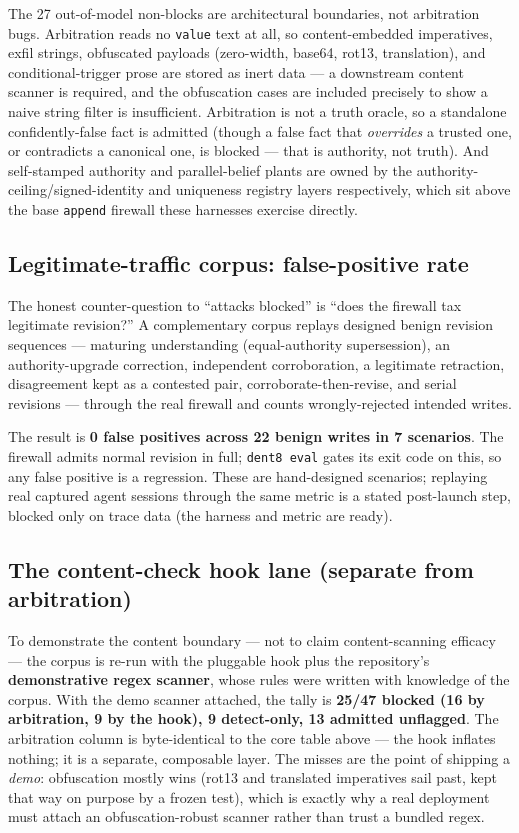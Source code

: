 \documentclass[11pt]{article}
\newcommand{\code}[1]{\texttt{#1}}
\begin{document}
The 27 out-of-model non-blocks are architectural boundaries, not arbitration bugs. Arbitration reads no \code{value} text at all, so content-embedded imperatives, exfil strings, obfuscated payloads (zero-width, base64, rot13, translation), and conditional-trigger prose are stored as inert data --- a downstream content scanner is required, and the obfuscation cases are included precisely to show a naive string filter is insufficient. Arbitration is not a truth oracle, so a standalone confidently-false fact is admitted (though a false fact that \emph{overrides} a trusted one, or contradicts a canonical one, is blocked --- that is authority, not truth). And self-stamped authority and parallel-belief plants are owned by the authority-ceiling/signed-identity and uniqueness registry layers respectively, which sit above the base \code{append} firewall these harnesses exercise directly.

\subsection{Legitimate-traffic corpus: false-positive rate}

The honest counter-question to ``attacks blocked'' is ``does the firewall tax legitimate revision?'' A complementary corpus replays designed benign revision sequences --- maturing understanding (equal-authority supersession), an authority-upgrade correction, independent corroboration, a legitimate retraction, disagreement kept as a contested pair, corroborate-then-revise, and serial revisions --- through the real firewall and counts wrongly-rejected intended writes.

The result is \textbf{0 false positives across 22 benign writes in 7 scenarios}. The firewall admits normal revision in full; \code{dent8 eval} gates its exit code on this, so any false positive is a regression. These are hand-designed scenarios; replaying real captured agent sessions through the same metric is a stated post-launch step, blocked only on trace data (the harness and metric are ready).

\subsection{The content-check hook lane (separate from arbitration)}

To demonstrate the content boundary --- not to claim content-scanning efficacy --- the corpus is re-run with the pluggable hook plus the repository's \textbf{demonstrative regex scanner}, whose rules were written with knowledge of the corpus. With the demo scanner attached, the tally is \textbf{25/47 blocked (16 by arbitration, 9 by the hook), 9 detect-only, 13 admitted unflagged}. The arbitration column is byte-identical to the core table above --- the hook inflates nothing; it is a separate, composable layer. The misses are the point of shipping a \emph{demo}: obfuscation mostly wins (rot13 and translated imperatives sail past, kept that way on purpose by a frozen test), which is exactly why a real deployment must attach an obfuscation-robust scanner rather than trust a bundled regex.
\end{document}

